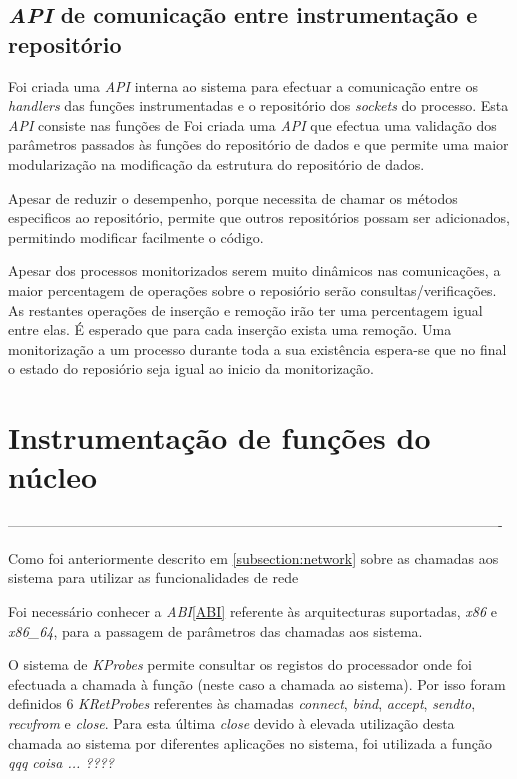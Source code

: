 \subsection{\textit{API} de comunicação entre instrumentação e repositório}

Foi criada uma \textit{API} interna ao sistema para efectuar a comunicação entre os \textit{handlers} das funções instrumentadas e o repositório dos \textit{sockets} do processo.
 Esta \textit{API} consiste nas funções de 
 Foi criada uma \textit{API} que efectua uma validação dos parâmetros passados às funções do repositório de dados e que permite uma maior modularização na modificação da estrutura do repositório de dados.

Apesar de reduzir o desempenho, porque necessita de chamar os métodos especificos ao repositório, permite que outros repositórios possam ser adicionados, permitindo modificar facilmente o código.

Apesar dos processos monitorizados serem muito dinâmicos nas comunicações, a maior percentagem de operações sobre o reposiório serão consultas/verificações.
 As restantes operações de inserção e remoção irão ter uma percentagem igual entre elas.
 É esperado que para cada inserção exista uma remoção.
 Uma monitorização a um processo durante toda a sua existência espera-se que no final o estado do reposiório seja igual ao inicio da monitorização.

\section{Instrumentação de funções do núcleo}

----------------------------------------------------------------------------------------------------------

Como foi anteriormente descrito em \ref{subsection:network} sobre as chamadas aos sistema para utilizar as funcionalidades de rede

Foi necessário conhecer a \textit{ABI}\ref{ABI}\cite{ABI} referente às arquitecturas suportadas, \textit{x86} e \textit{x86\_64}, para a passagem de parâmetros das chamadas aos sistema.

O sistema de \textit{KProbes} permite consultar os registos do processador onde foi efectuada a chamada à função (neste caso a chamada ao sistema).
 Por isso foram definidos 6 \textit{KRetProbes} referentes às chamadas \textit{connect}, \textit{bind}, \textit{accept}, \textit{sendto}, \textit{recvfrom} e
\textit{close}.
 Para esta última \textit{close} devido à elevada utilização desta chamada ao sistema por diferentes aplicações no sistema, foi utilizada a função \textit{qqq coisa ...  ????}

